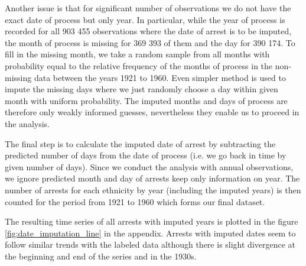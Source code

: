 Another issue is that for significant number of observations we do not have the exact date of process but only year. In particular, 
while the year of process is recorded for all 903 455 observations where the date of arrest is to be imputed, the month of process is missing for 369 393 of them and the day for 390 174. 
To fill in the missing month, we take a random sample from all months with probability equal to the relative frequency of the months of process in the non-missing data between the years 1921 to 1960. 
Even simpler method is used to impute the missing days where we just randomly choose a day within given month with uniform probability. 
The imputed months and days of process are therefore only weakly informed guesses, nevertheless they enable us to proceed in the analysis. 

The final step is to calculate the imputed date of arrest by subtracting the predicted number of days from the date of process (i.e. we go back in time by given number of days). Since we conduct the analysis with annual observations, we ignore predicted month and day of arrests  keep only information on year. The number of arrests for each ethnicity by year (including the imputed years) is then counted for the period from 1921 to 1960 which forms our final dataset. 

The resulting time series of all arrests with imputed years is plotted in the figure \ref{fig:date_imputation_line} in the appendix. Arrests with imputed dates seem to follow  similar trends with the labeled data  although there is slight divergence at the beginning and end of the series and in the 1930s.
